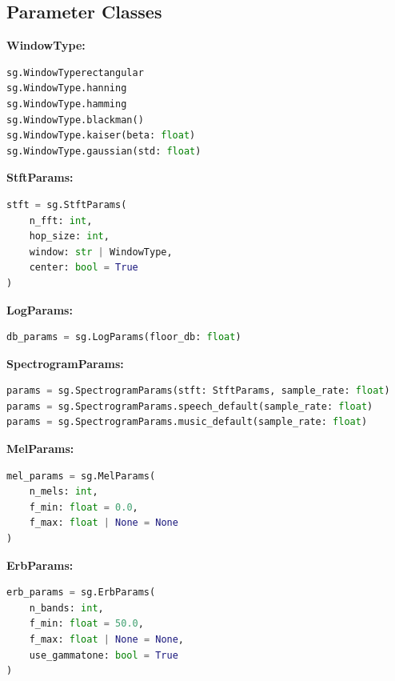 \subsection*{Parameter Classes}

\textbf{WindowType:}

\begin{lstlisting}[language=Python, caption={WindowType constructors and variants}]
sg.WindowTyperectangular
sg.WindowType.hanning
sg.WindowType.hamming
sg.WindowType.blackman()
sg.WindowType.kaiser(beta: float)
sg.WindowType.gaussian(std: float)
\end{lstlisting}

\textbf{StftParams:}

\begin{lstlisting}[language=Python, caption={StftParams constructor signature}]
stft = sg.StftParams(
    n_fft: int,
    hop_size: int,
    window: str | WindowType,
    center: bool = True
)
\end{lstlisting}

\textbf{LogParams:}

\begin{lstlisting}[language=Python, caption={LogParams constructor for dB floor}]
db_params = sg.LogParams(floor_db: float)
\end{lstlisting}

\textbf{SpectrogramParams:}

\begin{lstlisting}[language=Python, caption={SpectrogramParams constructors and presets}]
params = sg.SpectrogramParams(stft: StftParams, sample_rate: float)
params = sg.SpectrogramParams.speech_default(sample_rate: float)
params = sg.SpectrogramParams.music_default(sample_rate: float)
\end{lstlisting}

\textbf{MelParams:}

\begin{lstlisting}[language=Python, caption={MelParams constructor with frequency range}]
mel_params = sg.MelParams(
    n_mels: int,
    f_min: float = 0.0,
    f_max: float | None = None
)
\end{lstlisting}

\textbf{ErbParams:}

\begin{lstlisting}[language=Python, caption={ErbParams constructor with gammatone option}]
erb_params = sg.ErbParams(
    n_bands: int,
    f_min: float = 50.0,
    f_max: float | None = None,
    use_gammatone: bool = True
)
\end{lstlisting}

